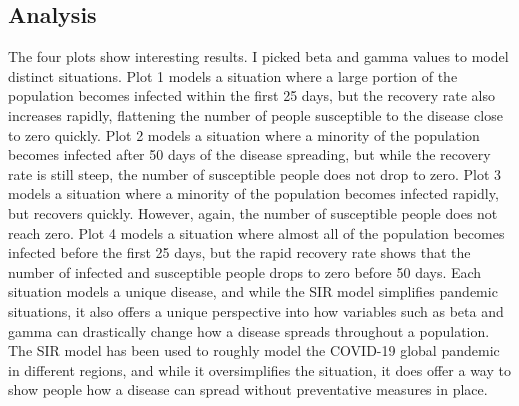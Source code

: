 \documentclass[12pt]{article}
\begin{document}
\subsection*{Analysis}
The four plots show interesting results. I picked beta and gamma values to model distinct situations. Plot 1 models a situation where a large portion of the population becomes infected within the first 25 days, but the recovery rate also increases rapidly, flattening the number of people susceptible to the disease close to zero quickly. Plot 2 models a situation where a minority of the population becomes infected after 50 days of the disease spreading, but while the recovery rate is still steep, the number of susceptible people does not drop to zero. Plot 3 models a situation where a minority of the population becomes infected rapidly, but recovers quickly. However, again, the number of susceptible people does not reach zero. Plot 4 models a situation where almost all of the population becomes infected before the first 25 days, but the rapid recovery rate shows that the number of infected and susceptible people drops to zero before 50 days. Each situation models a unique disease, and while the SIR model simplifies pandemic situations, it also offers a unique perspective into how variables such as beta and gamma can drastically change how a disease spreads throughout a population. The SIR model has been used to roughly model the COVID-19 global pandemic in different regions, and while it oversimplifies the situation, it does offer a way to show people how a disease can spread without preventative measures in place. 
\end{document}
